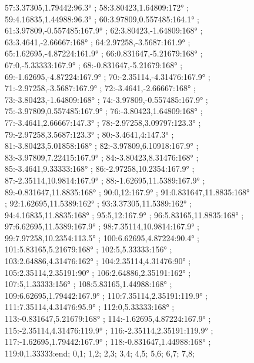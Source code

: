 \documentclass[a4paper,10pt,ngerman]{scrartcl}
\begin{document}
\begin{figure}[!h]
{            57:3.37305,1.79442:96.3° ;
            58:3.80423,1.64809:172° ;
            59:4.16835,1.44988:96.3° ;
            60:3.97809,0.557485:164.1° ;
            61:3.97809,-0.557485:167.9° ;
            62:3.80423,-1.64809:168° ;
            63:3.4641,-2.66667:168° ;
            64:2.97258,-3.5687:161.9° ;
            65:1.62695,-4.87224:161.9° ;
            66:0.831647,-5.21679:168° ;
            67:0,-5.33333:167.9° ;
            68:-0.831647,-5.21679:168° ;
            69:-1.62695,-4.87224:167.9° ;
            70:-2.35114,-4.31476:167.9° ;
            71:-2.97258,-3.5687:167.9° ;
            72:-3.4641,-2.66667:168° ;
            73:-3.80423,-1.64809:168° ;
            74:-3.97809,-0.557485:167.9° ;
            75:-3.97809,0.557485:167.9° ;
            76:-3.80423,1.64809:168° ;
            77:-3.4641,2.66667:147.3° ;
            78:-2.97258,3.09797:123.3° ;
            79:-2.97258,3.5687:123.3° ;
            80:-3.4641,4:147.3° ;
            81:-3.80423,5.01858:168° ;
            82:-3.97809,6.10918:167.9° ;
            83:-3.97809,7.22415:167.9° ;
            84:-3.80423,8.31476:168° ;
            85:-3.4641,9.33333:168° ;
            86:-2.97258,10.2354:167.9° ;
            87:-2.35114,10.9814:167.9° ;
            88:-1.62695,11.5389:167.9° ;
            89:-0.831647,11.8835:168° ;
            90:0,12:167.9° ;
            91:0.831647,11.8835:168° ;
            92:1.62695,11.5389:162° ;
            93:3.37305,11.5389:162° ;
            94:4.16835,11.8835:168° ;
            95:5,12:167.9° ;
            96:5.83165,11.8835:168° ;
            97:6.62695,11.5389:167.9° ;
            98:7.35114,10.9814:167.9° ;
            99:7.97258,10.2354:113.5° ;
            100:6.62695,4.87224:90.4° ;
            101:5.83165,5.21679:168° ;
            102:5,5.33333:156° ;
            103:2.64886,4.31476:162° ;
            104:2.35114,4.31476:90° ;
            105:2.35114,2.35191:90° ;
            106:2.64886,2.35191:162° ;
            107:5,1.33333:156° ;
            108:5.83165,1.44988:168° ;
            109:6.62695,1.79442:167.9° ;
            110:7.35114,2.35191:119.9° ;
            111:7.35114,4.31476:95.9° ;
            112:0,5.33333:168° ;
            113:-0.831647,5.21679:168° ;
            114:-1.62695,4.87224:167.9° ;
            115:-2.35114,4.31476:119.9° ;
            116:-2.35114,2.35191:119.9° ;
            117:-1.62695,1.79442:167.9° ;
            118:-0.831647,1.44988:168° ;
            119:0,1.33333:end;
        }{
            0,1;
            1,2;
            2,3;
            3,4;
            4,5;
            5,6;
            6,7;
            7,8;
}
\end{figure}
\end{document}

